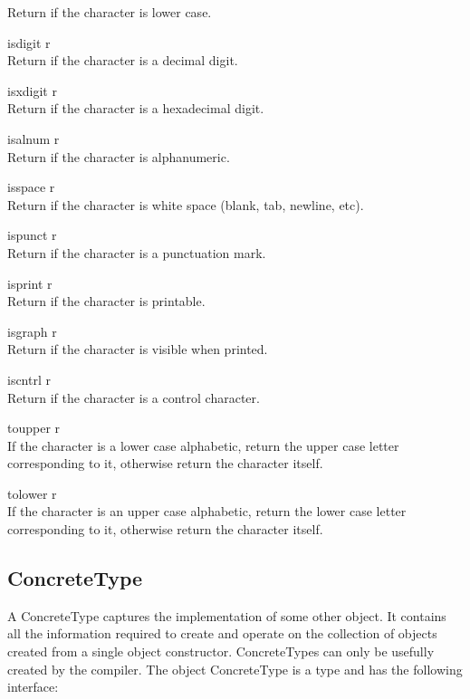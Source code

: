 \begin{desc}
    Return  if the character is lower case.  
  \item[\kw{function} isdigit \returns{} \/\LB{}r \CO{} \tn{Boolean}\/\RB{}]~\\
    Return  if the character is a decimal digit.
  \item[\kw{function} isxdigit \returns{} \/\LB{}r \CO{} \tn{Boolean}\/\RB{}]~\\
    Return  if the character is a hexadecimal digit.
  \item[\kw{function} isalnum \returns{} \/\LB{}r \CO{} \tn{Boolean}\/\RB{}]~\\
    Return  if the character is alphanumeric.
  \item[\kw{function} isspace \returns{} \/\LB{}r \CO{} \tn{Boolean}\/\RB{}]~\\
    Return  if the character is white space (blank, tab, newline, etc).
  \item[\kw{function} ispunct \returns{} \/\LB{}r \CO{} \tn{Boolean}\/\RB{}]~\\
    Return  if the character is a punctuation mark.
  \item[\kw{function} isprint \returns{} \/\LB{}r \CO{} \tn{Boolean}\/\RB{}]~\\
    Return  if the character is printable.
  \item[\kw{function} isgraph \returns{} \/\LB{}r \CO{} \tn{Boolean}\/\RB{}]~\\
    Return  if the character is visible when printed.
  \item[\kw{function} iscntrl \returns{} \/\LB{}r \CO{} \tn{Boolean}\/\RB{}]~\\
    Return  if the character is a control character.
  \item[\kw{function} toupper \returns{} \/\LB{}r \CO{} \tn{Character}\/\RB{}]~\\
    If the character is a lower case alphabetic, return the upper case
    letter corresponding to it, otherwise return the character itself.
  \item[\kw{function} tolower \returns{} \/\LB{}r \CO{} \tn{Character}\/\RB{}]~\\
    If the character is an upper case alphabetic, return the lower case
    letter corresponding to it, otherwise return the character itself.
\end{desc}

\subsection{ConcreteType}
\label{builtin ConcreteType}
A ConcreteType captures the implementation of some other object.  It
contains all the information required to create and operate on the
collection of objects created from a single object constructor.
ConcreteTypes can only be usefully created by the compiler.
The object ConcreteType is a type and has the following interface:

